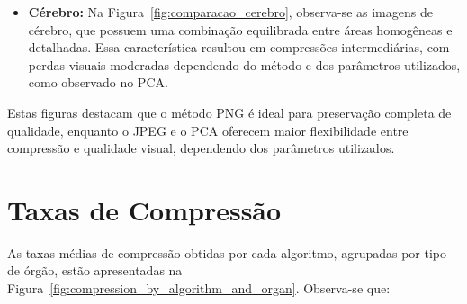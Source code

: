 \begin{itemize}
\begin{figure}[H]
{        }{
        }	
    \end{figure}
    \item \textbf{Cérebro:} Na Figura~\ref{fig:comparacao_cerebro}, observa-se as imagens de cérebro, que possuem uma combinação equilibrada entre áreas homogêneas e detalhadas. Essa característica resultou em compressões intermediárias, com perdas visuais moderadas dependendo do método e dos parâmetros utilizados, como observado no \acrshort{PCA}.
    \begin{figure}[H]
        \centering
    \end{figure}
\end{itemize}

Estas figuras destacam que o método \acrshort{PNG} é ideal para preservação completa de qualidade, enquanto o \acrshort{JPEG} e o \acrshort{PCA} oferecem maior flexibilidade entre compressão e qualidade visual, dependendo dos parâmetros utilizados.

\section{Taxas de Compressão}

As taxas médias de compressão obtidas por cada algoritmo, agrupadas por tipo de órgão, estão apresentadas na Figura~\ref{fig:compression_by_algorithm_and_organ}. Observa-se que:

